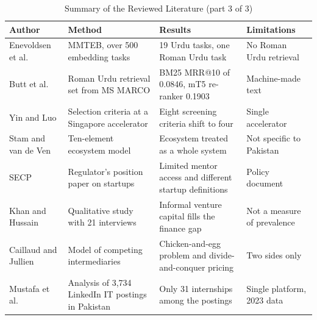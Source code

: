 \documentclass{FastFyp}
\begin{document}
\begin{table}[!ht]
\centering
\caption{Summary of the Reviewed Literature (part 3 of 3)}
\small
\setlength{\tabcolsep}{3pt}
\renewcommand{\arraystretch}{1.25}
\begin{tabular}{|p{3cm}|p{4cm}|p{4cm}|p{3cm}|}
\hline
\textbf{Author} & \textbf{Method} & \textbf{Results} & \textbf{Limitations} \\
\hline
Enevoldsen et al. \cite{ref:enevoldsen2025mmteb} & MMTEB, over 500 embedding tasks & 19 Urdu tasks, one Roman Urdu task & No Roman Urdu retrieval \\
\hline
Butt et al. \cite{ref:butt2025romanurduir} & Roman Urdu retrieval set from MS MARCO & BM25 MRR@10 of 0.0846, mT5 re-ranker 0.1903 & Machine-made text \\
\hline
Yin and Luo \cite{ref:yin2018accelerator} & Selection criteria at a Singapore accelerator & Eight screening criteria shift to four & Single accelerator \\
\hline
Stam and van de Ven \cite{ref:stam2021} & Ten-element ecosystem model & Ecosystem treated as a whole system & Not specific to Pakistan \\
\hline
SECP \cite{ref:secpposition} & Regulator's position paper on startups & Limited mentor access and different startup definitions & Policy document \\
\hline
Khan and Hussain \cite{ref:khan2026informal} & Qualitative study with 21 interviews & Informal venture capital fills the finance gap & Not a measure of prevalence \\
\hline
Caillaud and Jullien \cite{ref:caillaud2003} & Model of competing intermediaries & Chicken-and-egg problem and divide-and-conquer pricing & Two sides only \\
\hline
Mustafa et al. \cite{ref:mustafa2026itjobs} & Analysis of 3,734 LinkedIn IT postings in Pakistan & Only 31 internships among the postings & Single platform, 2023 data \\
\hline
\end{tabular}
\label{tab:lr-summary-3}
\end{table}
\end{document}
